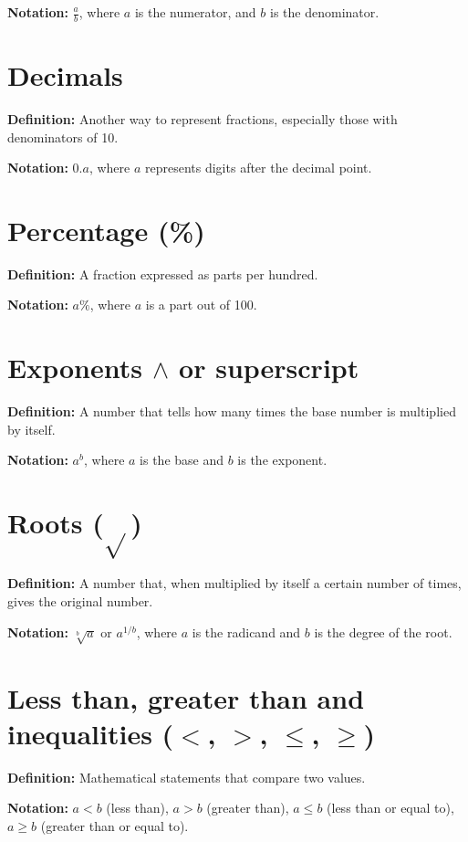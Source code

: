 \textbf{Notation:} \( \frac{a}{b} \), where \( a \) is the numerator, and \( b \) is the denominator.

\section{Decimals}

\textbf{Definition:} Another way to represent fractions, especially those with denominators of 10.

\textbf{Notation:} \( 0.a \), where \( a \) represents digits after the decimal point.

\section{Percentage (\%)}

\textbf{Definition:} A fraction expressed as parts per hundred.

\textbf{Notation:} \( a\% \), where \( a \) is a part out of 100.

\section{Exponents \(\wedge\) or superscript}

\textbf{Definition:} A number that tells how many times the base number is multiplied by itself.

\textbf{Notation:} \( a^b \), where \( a \) is the base and \( b \) is the exponent.

\section{Roots (\(\sqrt{}\))}

\textbf{Definition:} A number that, when multiplied by itself a certain number of times, gives the original number.

\textbf{Notation:} \( \sqrt[b]{a} \) or \( a^{1/b} \), where \( a \) is the radicand and \( b \) is the degree of the root.

\section{Less than, greater than and inequalities ($<$, $>$, $\leq$, $\geq$)}

\textbf{Definition:} Mathematical statements that compare two values.

\textbf{Notation:} \( a < b \) (less than), \( a > b \) (greater than), \( a \leq b \) (less than or equal to), \( a \geq b \) (greater than or equal to).

